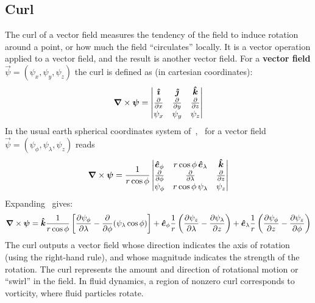 \subsection{Curl}\label{subsec:curl}
The curl of a vector field measures the tendency of the field to induce rotation around a point, or how much the field ``circulates'' locally.
It is a vector operation applied to a vector field, and the result is another vector field.
For a \textbf{vector field} $\vec{\psi}=(\psi_x,\psi_y,\psi_z)$ the curl is defined as (in cartesian coordinates):
\begin{equation}
	\curl{\vec{\psi}}=
	\begin{vmatrix}
		\unitv{\imath}              & \unitv{\jmath}              & \unitv{k}                   \\
		\frac{\partial}{\partial x} & \frac{\partial}{\partial y} & \frac{\partial}{\partial z} \\
		\psi_x                      & \psi_y                      & \psi_z
	\end{vmatrix}
	\label{eq:curl-def}
\end{equation}
In the usual earth spherical coordinates system
of~\secref{\ref{subsec:spherical-coordinate-systems}},~\eq{\ref{eq:curl-def}} for a vector field
$\vec{\psi} = (\psi_{\phi}, \psi_{\lambda}, \psi_{z})$ reads
\begin{equation}
	\curl{\vec{\psi}} =
	\frac{1}{r \cos\phi}
	\begin{vmatrix}
		\unitv{e}_\phi & r \cos\phi \, \unitv{e}_\lambda   & \unitv{k}                   \\
		\partialphi{}  & \frac{\partial}{\partial \lambda} & \frac{\partial}{\partial z} \\
		\psi_{\phi}    & r \cos\phi \, \psi_{\lambda}      & \psi_{z}
	\end{vmatrix}
	\label{eq:curl-spherical-coords-det}
\end{equation}
Expanding~\eq{\ref{eq:curl-spherical-coords-det}} gives:
\begin{equation}
	\curl{\vec{\psi}}=
	\unitv{k} \frac{1}{r \cos\phi} \left[ \partiallambda{\psi_{\phi}} - \partialphi{} (\psi_{\lambda} \cos\phi) \right]
	+ \unitv{e}_\phi \frac{1}{r} \left( \partiallambda{\psi_z} - \partialz{\psi_{\lambda}} \right)
	+ \unitv{e}_\lambda \frac{1}{r} \left( \partialz{\psi_{\phi}} -  \partialphi{\psi_{z}}\right)
	\label{eq:curl-spherical-coords}
\end{equation}
The curl outputs a vector field whose direction indicates the axis of rotation (using the right-hand rule),
and whose magnitude indicates the strength of the rotation.
The curl represents the amount and direction of rotational motion or ``swirl'' in the field.
In fluid dynamics, a region of nonzero curl corresponds to vorticity, where fluid particles rotate.

